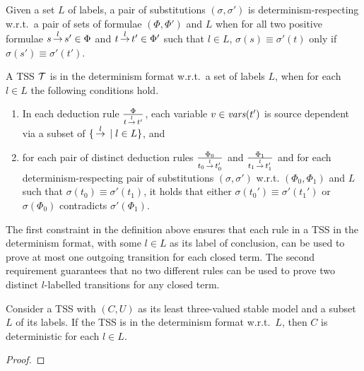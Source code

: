 \begin{definition}
Given a set $L$ of labels, a pair of substitutions $(\sigma,\sigma')$ is determinism-respecting w.r.t.\
a pair of sets of formulae $(\Phi, \Phi')$ and $L$ when for all two positive formulae $s \,{\stackrel{{l}}{\rightarrow}}\, s' \in \Phi$ and $t \,{\stackrel{{l}}{\rightarrow}}\, t' \in \Phi'$ such that $l \in L$, $\sigma(s) \equiv \sigma'(t)$ only if  $\sigma(s') \equiv \sigma'(t')$.
\end{definition}


\begin{definition}
A TSS $\mathcal{T}$ is in the determinism format w.r.t.\ a set of labels $L$,
when for each $l \in L$ the following conditions hold.
\begin{enumerate}
    \item In each deduction rule $\frac{\Phi}{t\,{\stackrel{{l}}{\rightarrow}}\,t'}$, each variable $v\in \mathit{vars}(t')$ is source dependent
          via a subset of $\{ \,{\stackrel{{l}}{\rightarrow}}\, \mid l \in L\}$, and
    \item for each pair of distinct deduction rules $\frac{\Phi_0}{t_0\,{\stackrel{{l}}{\rightarrow}}\,t_0'}$ and $\frac{\Phi_1}{t_1\,{\stackrel{{l}}{\rightarrow}}\,t_1'}$ and
          for each determinism-respecting pair of substitutions $(\sigma, \sigma')$ w.r.t. $(\Phi_0, \Phi_1)$ and $L$
          such that $\sigma(t_0)\equiv\sigma'(t_1)$, it holds that
          either $\sigma(t_0')\equiv\sigma'(t_1')$ or $\sigma(\Phi_0)$ contradicts $\sigma'(\Phi_1)$.
\end{enumerate}
\end{definition}

The first constraint in the definition above ensures that each rule in a TSS
in the determinism format, with some $l \in L$ as its label of conclusion,
can be used to prove at most one outgoing transition for each closed term.
The second requirement guarantees that no two different rules can be used to prove two distinct
$l$-labelled transitions for any closed term.

\begin{theorem}\label{th::det}
Consider a TSS with $(C, U)$ as its least three-valued stable model and a subset $L$ of its labels. If the TSS is in the determinism format w.r.t.\ $L$, then $C$ is deterministic for each $l\in L$.
\end{theorem}
\begin{proof}

\end{proof}

